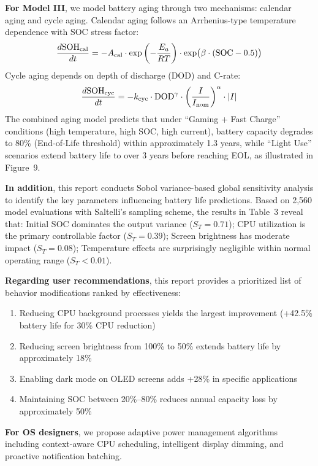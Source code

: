 \textbf{For Model III}, we model battery aging through two mechanisms: calendar aging and cycle aging. Calendar aging follows an Arrhenius-type temperature dependence with SOC stress factor:
\begin{equation*}
    \frac{d\text{SOH}_{\text{cal}}}{dt} = -A_{\text{cal}} \cdot \exp\left(-\frac{E_a}{RT}\right) \cdot \exp\bigl(\beta \cdot (\text{SOC} - 0.5)\bigr)
\end{equation*}
Cycle aging depends on depth of discharge (DOD) and C-rate:
\begin{equation*}
    \frac{d\text{SOH}_{\text{cyc}}}{dt} = -k_{\text{cyc}} \cdot \text{DOD}^{\gamma} \cdot \left(\frac{I}{I_{\text{nom}}}\right)^{\alpha} \cdot |I|
\end{equation*}
The combined aging model predicts that under ``Gaming + Fast Charge'' conditions (high temperature, high SOC, high current), battery capacity degrades to 80\% (End-of-Life threshold) within approximately 1.3 years, while ``Light Use'' scenarios extend battery life to over 3 years before reaching EOL, as illustrated in Figure~9.

\textbf{In addition}, this report conducts Sobol variance-based global sensitivity analysis to identify the key parameters influencing battery life predictions. Based on 2,560 model evaluations with Saltelli's sampling scheme, the results in Table~3 reveal that: Initial SOC dominates the output variance ($S_T = 0.71$); CPU utilization is the primary controllable factor ($S_T = 0.39$); Screen brightness has moderate impact ($S_T = 0.08$); Temperature effects are surprisingly negligible within normal operating range ($S_T < 0.01$).

\textbf{Regarding user recommendations}, this report provides a prioritized list of behavior modifications ranked by effectiveness:
\begin{enumerate}[leftmargin=*, nosep]
    \item Reducing CPU background processes yields the largest improvement (+42.5\% battery life for 30\% CPU reduction)
    \item Reducing screen brightness from 100\% to 50\% extends battery life by approximately 18\%
    \item Enabling dark mode on OLED screens adds +28\% in specific applications
    \item Maintaining SOC between 20\%--80\% reduces annual capacity loss by approximately 50\%
\end{enumerate}

\textbf{For OS designers}, we propose adaptive power management algorithms including context-aware CPU scheduling, intelligent display dimming, and proactive notification batching.

